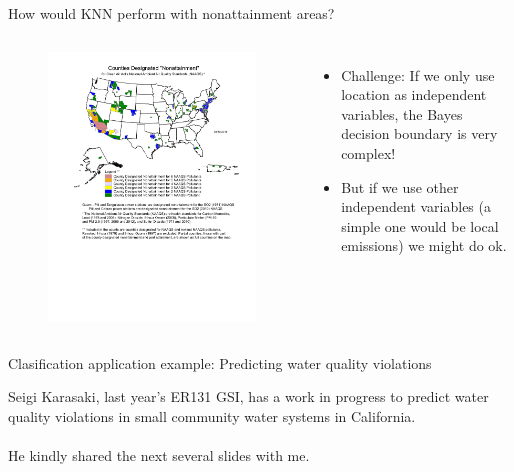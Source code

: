 \documentclass[aspectratio=169]{beamer}
\begin{document}
\begin{frame}{How would KNN perform with nonattainment areas?}

\begin{columns}
\begin{figure}
\includegraphics[width=\textwidth]{EPA_map_nonattain}
\caption*{}
\end{figure}
\pause
\begin{itemize}
\item Challenge: If we only use location as independent variables, the Bayes decision boundary is very complex!
\item But if we use other independent variables (a simple one would be local emissions) we might do ok.
\end{itemize}
\end{columns}
\end{frame}

\begin{frame}{Clasification application example: Predicting water quality violations}

Seigi Karasaki, last year's ER131 GSI, has a work in progress to predict water quality violations in small community water systems in California.\\~\\
He kindly shared the next several slides with me.

\end{frame}
\end{document}
